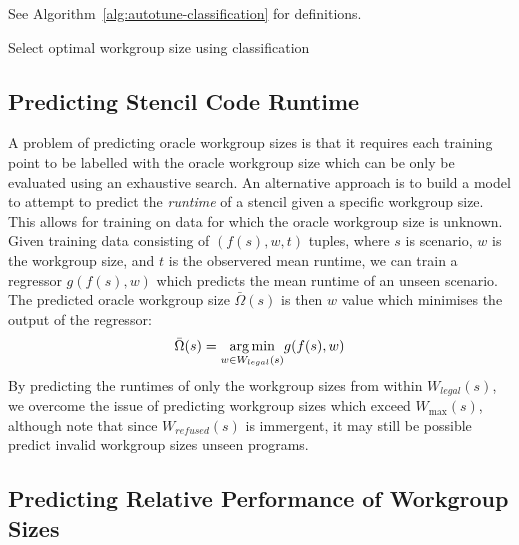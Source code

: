 See Algorithm~\ref{alg:autotune-classification} for definitions.

\begin{algorithm}

\caption{Select optimal workgroup size using classification}
\label{alg:autotune-classification}
\end{algorithm}

% 


\subsection{Predicting Stencil Code Runtime}

A problem of predicting oracle workgroup sizes is that it requires
each training point to be labelled with the oracle workgroup size
which can be only be evaluated using an exhaustive search. An
alternative approach is to build a model to attempt to predict the
\emph{runtime} of a stencil given a specific workgroup size. This
allows for training on data for which the oracle workgroup size is
unknown. Given training data consisting of $(f(s),w,t)$ tuples, where
$s$ is scenario, $w$ is the workgroup size, and $t$ is the observered
mean runtime, we can train a regressor $g(f(s), w)$ which predicts the
mean runtime of an unseen scenario. The predicted oracle workgroup
size $\bar{\Omega}(s)$ is then $w$ value which minimises the output of
the regressor:
%
\begin{equation}
  \bar{\Omega}(s) = \underset{w \in W_{legal}(s)}{\operatorname*{arg\,min}} g(f(s), w)
\end{equation}
%
By predicting the runtimes of only the workgroup sizes from within
$W_{legal}(s)$, we overcome the issue of predicting workgroup sizes
which exceed $W_{\max}(s)$, although note that since $W_{refused}(s)$
is immergent, it may still be possible predict invalid workgroup sizes
unseen programs.

% 

\subsection{Predicting Relative Performance of Workgroup Sizes}

